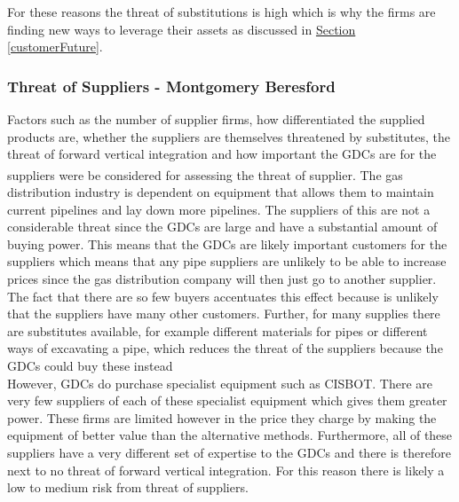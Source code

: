 \documentclass[11pt]{article}		%
\newcommand{\supercite}[1]{\textsuperscript{\cite{#1}}}		%
\newcommand{\sectref}[1]{\hyperref[#1]{Section \ref*{#1}}}     %
\begin{document}
                For these reasons the threat of substitutions is high which is why the firms are finding new ways to leverage their assets as discussed in \sectref{customerFuture}.%

     
		\subsubsection[Power of Suppliers]{Threat of Suppliers - Montgomery Beresford}
		         
		        Factors such as the number of supplier firms, how differentiated the supplied products are, whether the suppliers are themselves threatened by substitutes, the threat of forward vertical integration and how important the GDCs are for the suppliers were be considered for assessing the threat of supplier.\supercite{Barney}
		        The gas distribution industry is dependent on equipment that allows them to maintain current pipelines and lay down more pipelines.
		        The suppliers of this are not a considerable threat since the GDCs are large and have a substantial amount of buying power. This means that the GDCs are likely important customers for the suppliers which means that any pipe suppliers are unlikely to be able to increase prices since the gas distribution company will then just go to another supplier. The fact that there are so few buyers accentuates this effect because is unlikely that the suppliers have many other customers. Further, for many supplies there are substitutes available, for example different materials for pipes or different ways of excavating a pipe, which reduces the threat of the suppliers because the GDCs could buy these instead
                \\
                \hspace*{3ex}However, GDCs do purchase specialist equipment such as CISBOT. There are very few suppliers of each of these specialist equipment which gives them greater power. These firms are limited however in the price they charge by making the equipment of better value than the alternative methods. Furthermore, all of these suppliers have a very different set of expertise to the GDCs and there is therefore next to no threat of forward vertical integration.
                For this reason there is likely a low to medium risk from threat of suppliers.
\end{document}
